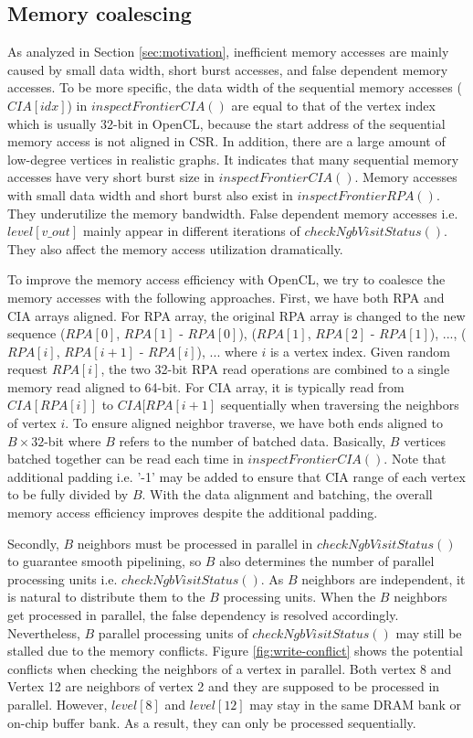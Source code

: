 \subsection{Memory coalescing}
As analyzed in Section \ref{sec:motivation}, inefficient memory accesses 
are mainly caused by small data width, short burst accesses, and false 
dependent memory accesses. To be more specific, the data width of the 
sequential memory accesses ($CIA[idx]$) in $inspectFrontierCIA()$ are equal to that of 
the vertex index which is usually 32-bit in OpenCL, because the start address of the 
sequential memory access is not aligned in CSR. In addition, there are 
a large amount of low-degree vertices in realistic graphs. It indicates 
that many sequential memory accesses have very short burst size 
in $inspectFrontierCIA()$. Memory accesses with small data width and 
short burst also exist in $inspectFrontierRPA()$. They underutilize 
the memory bandwidth. False dependent memory accesses i.e. $level[v\_out]$ 
mainly appear in different iterations of $checkNgbVisitStatus()$. They 
also affect the memory access utilization dramatically. 

To improve the memory access efficiency with OpenCL, we try to coalesce the 
memory accesses with the following approaches.
First, we have both RPA and CIA arrays aligned.
For RPA array, the original RPA array is changed to the new sequence 
($RPA[0]$, $RPA[1]$ - $RPA[0]$), ($RPA[1]$, $RPA[2]$ - $RPA[1]$), ..., ($RPA[i]$, $RPA[i+1]$ - $RPA[i]$), ...
where $i$ is a vertex index. Given random request $RPA[i]$, the two 32-bit RPA read 
operations are combined to a single memory read aligned to 64-bit. For CIA array, it is typically read 
from $CIA[RPA[i]]$ to $CIA[RPA[i+1]$ sequentially when traversing the neighbors of vertex $i$. 
To ensure aligned neighbor traverse, we have both ends aligned to $B \times 32$-bit where $B$ refers to 
the number of batched data. Basically, $B$ vertices batched together can be read each time in $inspectFrontierCIA()$.
Note that additional padding i.e. '-1' may be added to ensure that CIA range of each vertex 
to be fully divided by $B$. With the data alignment and batching, the overall memory access efficiency 
improves despite the additional padding.

Secondly, $B$ neighbors must be processed in parallel in $checkNgbVisitStatus()$ to guarantee 
smooth pipelining, so $B$ also determines the number of parallel processing units i.e. 
$checkNgbVisitStatus()$. As $B$ neighbors are independent, it is natural to 
distribute them to the $B$ processing units. When the $B$ neighbors get processed 
in parallel, the false dependency is resolved accordingly. Nevertheless, 
$B$ parallel processing units of $checkNgbVisitStatus()$ may still 
be stalled due to the memory conflicts. Figure \ref{fig:write-conflict} 
shows the potential conflicts when checking the neighbors of a vertex in parallel.  
Both vertex 8 and Vertex 12 are neighbors of vertex 2 and they are supposed to be 
processed in parallel. However, $level[8]$ and $level[12]$ may stay in the same 
DRAM bank or on-chip buffer bank. As a result, they can only be processed sequentially.   

